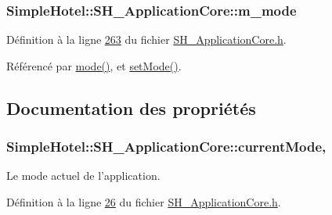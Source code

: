 \hypertarget{classSimpleHotel_1_1SH__ApplicationCore_a66a3e44eeddafaea7553740a9686d2b3}{
\subsubsection[{m\-\_\-mode}]{\setlength{\rightskip}{0pt plus 5cm}Simple\-Hotel\-::\-S\-H\-\_\-\-Application\-Core\-::m\-\_\-mode\hspace{0.3cm}{\ttfamily [private]}}}\label{classSimpleHotel_1_1SH__ApplicationCore_a66a3e44eeddafaea7553740a9686d2b3}


Définition à la ligne \hyperlink{SH__ApplicationCore_8h_source_l00263}{263} du fichier \hyperlink{SH__ApplicationCore_8h_source}{S\-H\-\_\-\-Application\-Core.\-h}.



Référencé par \hyperlink{classSimpleHotel_1_1SH__ApplicationCore_a508c10bf5c106f265f314ee1c0e113ae}{mode()}, et \hyperlink{classSimpleHotel_1_1SH__ApplicationCore_a1661e9a56883ec760064066386b47bab}{set\-Mode()}.



\subsection{Documentation des propriétés}
\hypertarget{classSimpleHotel_1_1SH__ApplicationCore_a62dd46ad070b7ad8587bc7001a93f6e9}{
\subsubsection[{current\-Mode}]{\setlength{\rightskip}{0pt plus 5cm}Simple\-Hotel\-::\-S\-H\-\_\-\-Application\-Core\-::current\-Mode\hspace{0.3cm}{\ttfamily [read]}, {\ttfamily [write]}}}\label{classSimpleHotel_1_1SH__ApplicationCore_a62dd46ad070b7ad8587bc7001a93f6e9}


Le mode actuel de l'application. 



Définition à la ligne \hyperlink{SH__ApplicationCore_8h_source_l00026}{26} du fichier \hyperlink{SH__ApplicationCore_8h_source}{S\-H\-\_\-\-Application\-Core.\-h}.


